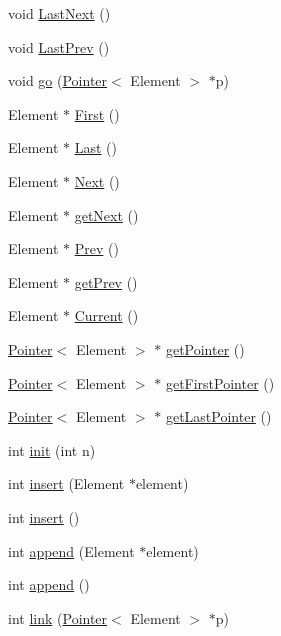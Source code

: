 \begin{CompactItemize}
\item 
void \hyperlink{classList_16464ad4ad6ecb1daef625d2cad44db2}{LastNext} ()
\item 
void \hyperlink{classList_bcd5880a9c91c1007a7f977aee2bee12}{LastPrev} ()
\item 
void \hyperlink{classList_cef5fb9410906f968eefb7f4af8c9d05}{go} (\hyperlink{structPointer}{Pointer}$<$ Element $>$ $\ast$p)
\item 
Element $\ast$ \hyperlink{classList_ce217a2fdab3ec404fd4f6d9609af830}{First} ()
\item 
Element $\ast$ \hyperlink{classList_191fcfa17a21244d46e47d848f361cdf}{Last} ()
\item 
Element $\ast$ \hyperlink{classList_9427eb3a61700d4271ff0c2462b8d1ec}{Next} ()
\item 
Element $\ast$ \hyperlink{classList_64cac9b28ca614fea3914a4c1e218a47}{getNext} ()
\item 
Element $\ast$ \hyperlink{classList_4891b8f96a259673aa3f7ae84a940116}{Prev} ()
\item 
Element $\ast$ \hyperlink{classList_b0424d273b7072f2b7381232590b3f37}{getPrev} ()
\item 
Element $\ast$ \hyperlink{classList_1e1f9ae5124cf7d18871fcd68e579d29}{Current} ()
\item 
\hyperlink{structPointer}{Pointer}$<$ Element $>$ $\ast$ \hyperlink{classList_696cc1fe666cd3c0d22d29c38541f8d0}{getPointer} ()
\item 
\hyperlink{structPointer}{Pointer}$<$ Element $>$ $\ast$ \hyperlink{classList_b019684a93ca7667f242419f23fc3229}{getFirstPointer} ()
\item 
\hyperlink{structPointer}{Pointer}$<$ Element $>$ $\ast$ \hyperlink{classList_bc5adccd5f9c6e18e753347e27c1e2bb}{getLastPointer} ()
\item 
int \hyperlink{classList_3e35a7778134a389e6bc935869efb2ba}{init} (int n)
\item 
int \hyperlink{classList_77411bba9fc76562ff903493ccf059a0}{insert} (Element $\ast$element)
\item 
int \hyperlink{classList_3e0734f98d7a50f15323f9b6131a2503}{insert} ()
\item 
int \hyperlink{classList_504217c2e6f8db0342556f8a50306a13}{append} (Element $\ast$element)
\item 
int \hyperlink{classList_c23e16a949972776ee9b9213681db8ad}{append} ()
\item 
int \hyperlink{classList_d2d9499975ef0a258d56a9167f589a32}{link} (\hyperlink{structPointer}{Pointer}$<$ Element $>$ $\ast$p)

\end{CompactItemize}
